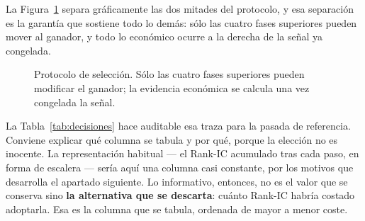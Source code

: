 La Figura~\ref{fig:protocolo} separa gráficamente las dos mitades del protocolo, y esa separación es
la garantía que sostiene todo lo demás: sólo las cuatro fases superiores pueden mover al ganador, y
todo lo económico ocurre a la derecha de la señal ya congelada.

\begin{figure}[H]
  \centering
  \caption{Protocolo de selección. Sólo las cuatro fases superiores pueden modificar el ganador;
  la evidencia económica se calcula una vez congelada la señal.}
  \label{fig:protocolo}
\end{figure}

La Tabla~\ref{tab:decisiones} hace auditable esa traza para la pasada de referencia. Conviene
explicar qué columna se tabula y por qué, porque la elección no es inocente. La representación
habitual --- el Rank-IC acumulado tras cada paso, en forma de escalera --- sería aquí una columna
casi constante, por los motivos que desarrolla el apartado siguiente. Lo informativo, entonces, no
es el valor que se conserva sino \textbf{la alternativa que se descarta}: cuánto Rank-IC habría
costado adoptarla. Esa es la columna que se tabula, ordenada de mayor a menor coste.

\begin{table}[H]
  \centering
  \small
  \caption{Qué alternativa se rechazó en cada decisión y cuánto habría costado adoptarla.}
  \label{tab:decisiones}
  \resizebox{\textwidth}{!}{}
  \caption*{El coste es el Rank-IC de la mejor alternativa menos el del ganador; un coste
  \emph{positivo} indica que la alternativa medía mejor y que el ganador se decidió por otra vía, lo
  que sólo ocurre en los empates técnicos. No debe confundirse con la \emph{ventaja pareada}, que
  promedia la diferencia cohorte a cohorte: en  el coste es $-0{,}0071$ y la
  ventaja pareada $+0{,}00699$.}
\end{table}

